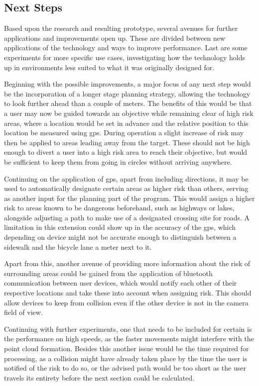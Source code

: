 \documentclass[a4paper]{article}
\begin{document}
\subsection{Next Steps} \label{next-steps}

Based upon the research and resulting prototype, several avenues for further applications and improvements open up. These are divided between new applications of the technology and ways to improve performance. Last are some experiments for more specific use cases, investigating how the technology holds up in environments less suited to what it was originally designed for.

Beginning with the possible improvements, a major focus of any next step would be the incorporation of a longer stage planning strategy, allowing the technology to look further ahead than a couple of meters. The benefits of this would be that a user may now be guided towards an objective while remaining clear of high risk areas, where a location would be set in advance and the relative position to this location be measured using gps. During operation a slight increase of risk may then be applied to areas leading away from the target. These should not be high enough to divert a user into a high risk area to reach their objective, but would be sufficient to keep them from going in circles without arriving anywhere.

Continuing on the application of gps, apart from including directions, it may be used to automatically designate certain areas as higher risk than others, serving as another input for the planning part of the program. This would assign a higher risk to areas known to be dangerous beforehand, such as highways or lakes, alongside adjusting a path to make use of a designated crossing site for roads. A limitation in this extension could show up in the accuracy of the gps, which depending on device might not be accurate enough to distinguish between a sidewalk and the bicycle lane a meter next to it.

Apart from this, another avenue of providing more information about the risk of surrounding areas could be gained from the application of bluetooth communication between user devices, which would notify each other of their respective locations and take these into account when assigning risk. This should allow devices to keep from collision even if the other device is not in the camera field of view.

Continuing with further experiments, one that needs to be included for certain is the performance on high speeds, as the faster movements might interfere with the point cloud formation. Besides this another issue would be the time required for processing, as a collision might have already taken place by the time the user is notified of the risk to do so, or the advised path would be too short as the user travels its entirety before the next section could be calculated.
\end{document}
